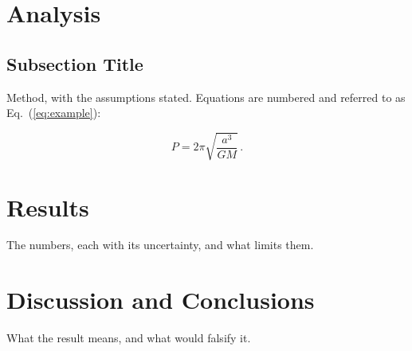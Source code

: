 \documentclass{acta}
\begin{document}
\section{Analysis}

\subsection{Subsection Title}

Method, with the assumptions stated. Equations are numbered and referred
to as Eq.~(\ref{eq:example}):

\begin{equation}
P = 2\pi\sqrt{\frac{a^{3}}{GM}}\,.
\label{eq:example}
\end{equation}



\section{Results}

The numbers, each with its uncertainty, and what limits them.

\section{Discussion and Conclusions}

What the result means, and what would falsify it.



\end{document}
